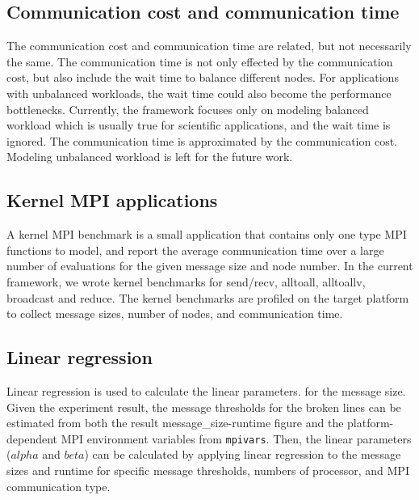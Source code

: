 \subsection{Communication cost and communication time}
The communication cost and communication time are related, but not necessarily the same.
The communication time is not only effected by the communication cost,
but also include the wait time to balance different nodes.
For applications with unbalanced workloads,
the wait time could also become the performance bottlenecks.
Currently, the framework focuses only on
modeling balanced workload which is usually true for scientific applications,
and the wait time is ignored.
The communication time is approximated by the communication cost.
Modeling unbalanced workload is left for the future work.

\subsection{Kernel MPI applications}
A kernel MPI benchmark
is a small application that contains only one type MPI functions to model,
and report the average communication time over a large number of evaluations for the given message size and node number.
In the current framework,
  we wrote kernel benchmarks for send/recv, alltoall, alltoallv, broadcast and reduce.
The kernel benchmarks are profiled on the target platform
to collect message sizes, number of nodes, and communication time.

\subsection{Linear regression}
Linear regression is used to calculate the linear parameters.
for the message size.
Given the experiment result,
  the message thresholds for the broken lines can be estimated
  from both the result message\_size-runtime figure
  and the platform-dependent MPI environment variables from \texttt{mpivars}.
Then, the linear parameters ($alpha$ and $beta$)
can be calculated by applying linear regression to the message sizes and runtime
for specific message thresholds, numbers of processor, and MPI communication type.

